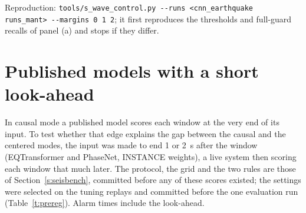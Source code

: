 \documentclass[11pt,a4paper]{article}
\newcommand{\tool}[1]{\nolinkurl{#1}}
\begin{document}
\noindent Reproduction: \tool{tools/s_wave_control.py --runs <cnn_earthquake
runs_mant> --margins 0 1 2}; it first reproduces the thresholds and full-guard
recalls of panel (a) and stops if they differ.

\clearpage
\section{Published models with a short look-ahead}\label{s:ahead}

In causal mode a published model scores each window at the very end of its
input. To test whether that edge explains the gap between the causal and the
centered modes, the input was made to end 1 or 2~s after the window (EQTransformer
and PhaseNet, INSTANCE weights), a live system then scoring each window that much
later. The protocol, the grid and the two rules are those of Section~\ref{s:seisbench},
committed before any of these scores existed; the settings were selected on the
tuning replays and committed before the one evaluation run (Table~\ref{t:prereg}). Alarm times include the look-ahead.
\end{document}
